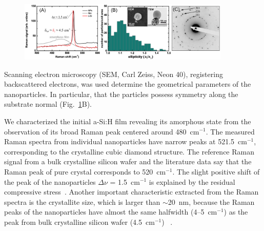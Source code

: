         \subsubsection{}
            \begin{figure}[!ht]
                    \begin{center}
                        \includegraphics[width=0.9\textwidth]{figs/results/fab/Crystallinity.eps}
                    \end{center}
                    \caption{}
                    \label{fig:Crystallinity}
            \end{figure}

                Scanning electron microscopy (SEM, Carl Zeiss, Neon 40), registering backscattered electrons, was used
            determine the geometrical parameters of the nanoparticles. In particular, that the particles possess 
            symmetry along the substrate normal (Fig.~\ref{fig:Crystallinity}B).

                We characterized the initial a-Si:H film revealing its amorphous state from the observation of its broad Raman
            peak centered around 480~cm$^{-1}$. The measured Raman spectra from individual nanoparticles have narrow peaks at
            521.5~cm$^{-1}$, corresponding to the crystalline cubic diamond structure. The reference Raman signal from a bulk
            crystalline silicon wafer and the literature data say that the Raman peak of pure crystal corresponds to 520~cm$^{-1}$.
            The slight positive shift of the peak of the nanoparticles $\Delta$$\nu$ = 1.5~cm$^{-1}$ is explained by the
            residual compressive stress~\cite{de1996micro}. Another important characteristic extracted from the Raman spectra
            is the crystallite size, which is larger than $\sim$20~nm, because the Raman peaks of the nanoparticles have
            almost the same halfwidth (4--5~cm$^{-1}$) as the peak from bulk crystalline silicon wafer (4.5~cm$^{-1}$)
            ~\cite{campbell1986effects}.

